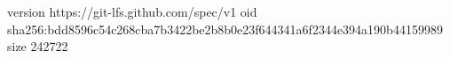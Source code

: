 version https://git-lfs.github.com/spec/v1
oid sha256:bdd8596c54c268cba7b3422be2b8b0e23f644341a6f2344e394a190b44159989
size 242722
